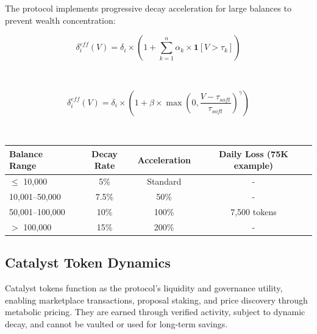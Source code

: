 \documentclass[11pt,letterpaper]{article}
\begin{document}
The protocol implements progressive decay acceleration for large balances to prevent wealth concentration:

\begin{equation}
\delta_i^{eff}(V) = \delta_i \times \left(1 + \sum_{k=1}^{n} \alpha_k \times \mathbf{1}[V > \tau_k]\right)
\end{equation}


~

\begin{equation}
\delta_i^{eff}(V) = \delta_i \times \left(1 + \beta \times \max\left(0, \frac{V - \tau_{soft}}{\tau_{soft}}\right)^{\gamma}\right)
\end{equation}


~


\begin{table}[H]
\centering
\begin{tabular}{lccc}
\toprule
\textbf{Balance Range} & \textbf{Decay Rate} & \textbf{Acceleration} & \textbf{Daily Loss (75K example)} \\
\midrule
$\leq$ 10,000 & 5\% & Standard & - \\
10,001--50,000 & 7.5\% & 50\% & - \\
50,001--100,000 & 10\% & 100\% & 7,500 tokens \\
$>$ 100,000 & 15\% & 200\% & - \\
\bottomrule
\end{tabular}
\end{table}


\subsection{Catalyst Token Dynamics}

Catalyst tokens function as the protocol’s liquidity and governance utility, enabling marketplace transactions, proposal staking, and price discovery through metabolic pricing. They are earned through verified activity, subject to dynamic decay, and cannot be vaulted or used for long-term savings.
\end{document}
